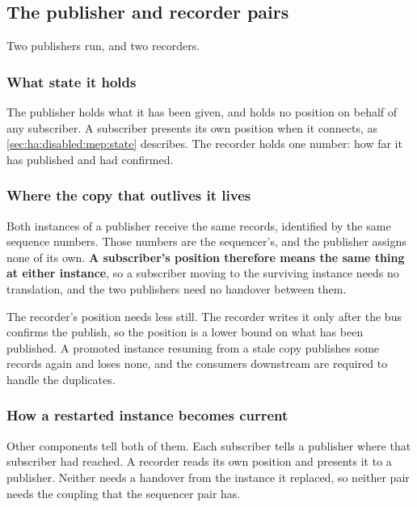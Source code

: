 \subsection{The publisher and recorder pairs}
\label{sec:ha:enabled:publishing}

Two publishers run, and two recorders.

\subsubsection{What state it holds}
\label{sec:ha:enabled:publishing:state}

The publisher holds what it has been given, and holds no position on behalf of
any subscriber. A subscriber presents its own position when it connects, as
\cref{sec:ha:disabled:mep:state} describes. The recorder holds one number: how
far it has published and had confirmed.

\subsubsection{Where the copy that outlives it lives}
\label{sec:ha:enabled:publishing:durable}

Both instances of a publisher receive the same records, identified by the same
sequence numbers. Those numbers are the sequencer's, and the publisher assigns
none of its own. \textbf{A subscriber's position therefore means the same thing
at either instance}, so a subscriber moving to the surviving instance needs no
translation, and the two publishers need no handover between them.

The recorder's position needs less still. The recorder writes it only after the
bus confirms the publish, so the position is a lower bound on what has been
published. A promoted instance resuming from a stale copy publishes some records
again and loses none, and the consumers downstream are required to handle the
duplicates.

\subsubsection{How a restarted instance becomes current}
\label{sec:ha:enabled:publishing:recovery}

Other components tell both of them. Each subscriber tells a publisher where that
subscriber had reached. A recorder reads its own position and presents it to a
publisher. Neither needs a handover from the instance it replaced, so neither
pair needs the coupling that the sequencer pair has.


